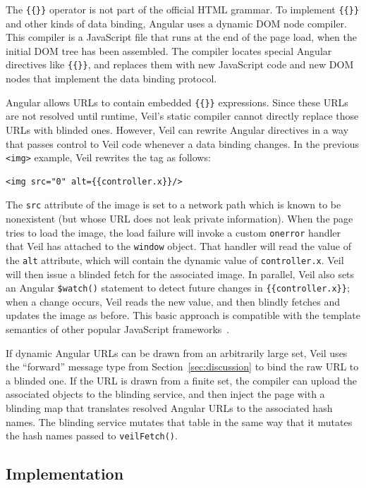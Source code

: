 The \texttt{\{\{\}\}} operator is not part of the official
HTML grammar. To implement \texttt{\{\{\}\}} and other
kinds of data binding, Angular uses a dynamic DOM
node compiler. This compiler is a JavaScript file
that runs at the end of the page load, when the initial DOM
tree has been assembled. The compiler locates special
Angular directives like \texttt{\{\{\}\}}, and replaces
them with new JavaScript code and new DOM nodes
that implement the data binding protocol.

Angular allows URLs to contain embedded \texttt{\{\{\}\}}
expressions. Since these URLs are not resolved until
runtime, Veil's static compiler cannot directly
replace those URLs with blinded ones. However, Veil
can rewrite Angular directives in a way that passes
control to Veil code whenever a data binding changes.
In the previous \texttt{<img>} example, Veil rewrites
the tag as follows:

\begin{verbatim}
<img src="0" alt={{controller.x}}/>
\end{verbatim}
The \texttt{src} attribute of the image is set to
a network path which is known to be nonexistent
(but whose URL does not leak private information).
When the page tries to load the image, the load
failure will invoke a custom \texttt{onerror}
handler that Veil has attached to the \texttt{window}
object. That handler will read the value of the
\texttt{alt} attribute, which will contain the
dynamic value of \texttt{controller.x}. Veil
will then issue a blinded fetch for the associated
image. In parallel, Veil also sets an Angular
\texttt{\$watch()} statement to detect future
changes in \texttt{\{\{controller.x\}\}}; when a
change occurs, Veil reads the new value, and then
blindly fetches and updates the image as before.
This basic approach is compatible with the template
semantics of other popular JavaScript
frameworks~\cite{backbone,kendo,ember}.

If dynamic Angular URLs can be drawn from an arbitrarily
large set, Veil uses the ``forward'' message type
from Section~\ref{sec:discussion} to bind the
raw URL to a blinded one. If the URL is drawn
from a finite set, the compiler can upload the
associated objects to the blinding service,
and then inject the page with a blinding
map that translates resolved Angular URLs
to the associated hash names. The blinding
service mutates that table in the same way
that it mutates the hash names passed to
\texttt{veilFetch()}.

\subsection{Implementation}
\label{sec:impl}

